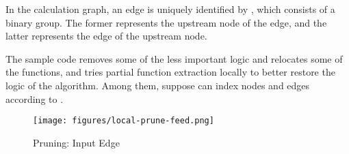 In the calculation graph, an edge is uniquely identified by , which consists of a  binary group. The former represents the upstream node of the edge, and the latter represents the edge of the upstream node.

The sample code removes some of the less important logic and relocates some of the functions, and tries partial function extraction locally to better restore the logic of the algorithm. Among them, suppose  can index nodes and edges according to .

\begin{figure}[H]
  \centering
  \texttt{[image: figures/local-prune-feed.png]}
  \caption{Pruning: Input Edge}
  \label{fig:local-prune-feed}
\end{figure}

